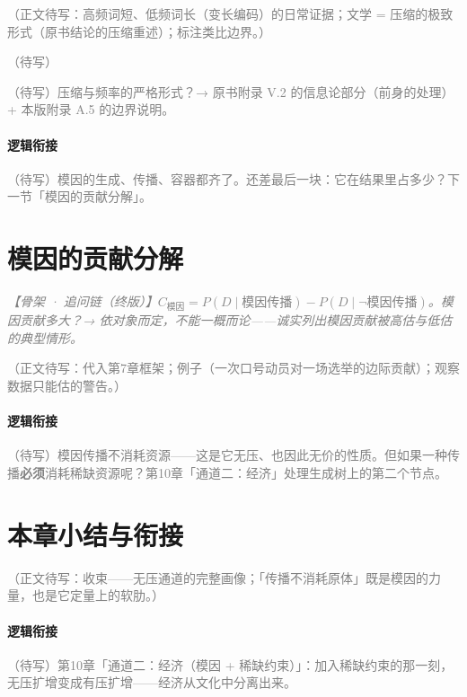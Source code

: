 \documentclass[../../main2.tex]{subfiles}
\begin{document}
	\textcolor{gray}{（正文待写：高频词短、低频词长（变长编码）的日常证据；文学 = 压缩的极致形式（原书结论的压缩重述）；\lowfreq 标注类比边界。）}

	\begin{readingnote}
		\textcolor{gray}{（待写）}
	\end{readingnote}

	\begin{reader_anticipation}
		\item \textcolor{gray}{（待写）压缩与频率的严格形式？→ 原书附录 V.2 的信息论部分（前身的处理）+ 本版附录 A.5 的边界说明。}
	\end{reader_anticipation}

	\paragraph*{逻辑衔接}
	\textcolor{gray}{（待写）模因的生成、传播、容器都齐了。还差最后一块：它在结果里占多少？下一节「模因的贡献分解」。}

	\section{模因的贡献分解}
	\label{sec:meme-contribution}

	\textcolor{gray}{\textit{【骨架 · 追问链（终版）】$C_{\text{模因}} = P(D \mid \text{模因传播}) - P(D \mid \neg \text{模因传播})$。模因贡献多大？→ 依对象而定，不能一概而论——诚实列出模因贡献被高估与低估的典型情形。}}

	\textcolor{gray}{（正文待写：代入第7章框架；例子（一次口号动员对一场选举的边际贡献）；观察数据只能估的警告。）}

	\paragraph*{逻辑衔接}
	\textcolor{gray}{（待写）模因传播不消耗资源——这是它无压、也因此无价的性质。但如果一种传播\textbf{必须}消耗稀缺资源呢？第10章「通道二：经济」处理生成树上的第二个节点。}

	\section{本章小结与衔接}
	\label{sec:meme-summary}

	\textcolor{gray}{（正文待写：收束——无压通道的完整画像；「传播不消耗原体」既是模因的力量，也是它定量上的软肋。）}

	\paragraph*{逻辑衔接}
	\textcolor{gray}{（待写）第10章「通道二：经济（模因 + 稀缺约束）」：加入稀缺约束的那一刻，无压扩增变成有压扩增——经济从文化中分离出来。}
\end{document}
